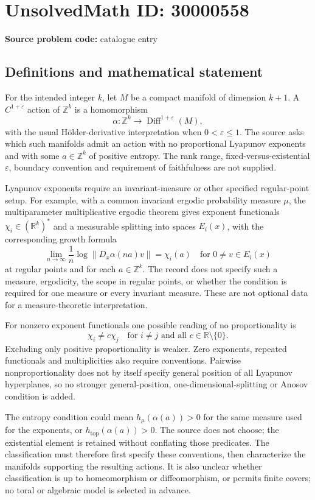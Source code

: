 \documentclass[11pt]{article}
\newcommand{\Z}{\mathbb{Z}}
\newcommand{\R}{\mathbb{R}}
\begin{document}
\section*{UnsolvedMath ID: 30000558}
\textbf{Source problem code:} catalogue entry
\subsection{Definitions and mathematical statement}
For the intended integer \(k\), let \(M\) be a compact manifold of dimension \(k+1\). A \(C^{1+\varepsilon}\) action of \(\Z^k\) is a homomorphism
\[
 \alpha:\Z^k\longrightarrow\operatorname{Diff}^{1+\varepsilon}(M),
\]
with the usual H\"older-derivative interpretation when \(0<\varepsilon\leq1\). The source asks which such manifolds admit an action with no proportional Lyapunov exponents and with some \(a\in\Z^k\) of positive entropy. The rank range, fixed-versus-existential \(\varepsilon\), boundary convention and requirement of faithfulness are not supplied.

Lyapunov exponents require an invariant-measure or other specified regular-point setup. For example, with a common invariant ergodic probability measure \(\mu\), the multiparameter multiplicative ergodic theorem gives exponent functionals \(\chi_i\in(\R^k)^*\) and a measurable splitting into spaces \(E_i(x)\), with the corresponding growth formula
\[
 \lim_{n\to\infty}\frac1n\log\|D_x\alpha(na)v\|=\chi_i(a)
 \quad\text{for }0\ne v\in E_i(x)
\]
at regular points and for each \(a\in\Z^k\). The record does not specify such a measure, ergodicity, the scope in regular points, or whether the condition is required for one measure or every invariant measure. These are not optional data for a measure-theoretic interpretation.

For nonzero exponent functionals one possible reading of no proportionality is
\[
 \chi_i\ne c\chi_j\quad\text{for }i\ne j\text{ and all }c\in\R\setminus\{0\}.
\]
Excluding only positive proportionality is weaker. Zero exponents, repeated functionals and multiplicities also require conventions. Pairwise nonproportionality does not by itself specify general position of all Lyapunov hyperplanes, so no stronger general-position, one-dimensional-splitting or Anosov condition is added.

The entropy condition could mean \(h_\mu(\alpha(a))>0\) for the same measure used for the exponents, or \(h_{\mathrm{top}}(\alpha(a))>0\). The source does not choose; the existential element is retained without conflating those predicates. The classification must therefore first specify these conventions, then characterize the manifolds supporting the resulting actions. It is also unclear whether classification is up to homeomorphism or diffeomorphism, or permits finite covers; no toral or algebraic model is selected in advance.
\end{document}
